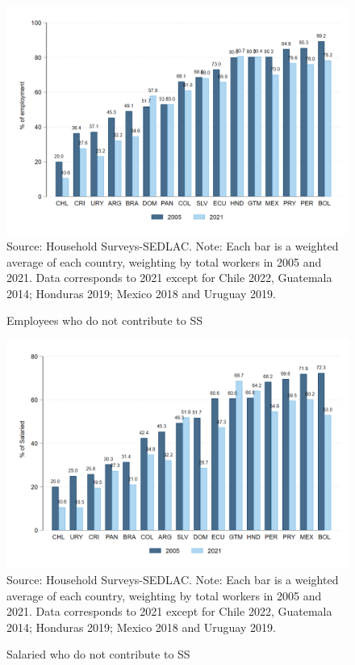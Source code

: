 \documentclass[english]{article}
\begin{document}
\begin{figure}[h!tbp]
    \justifying
     \caption{Employees who do not contribute to SS}     
     \includegraphics[scale=.3]{latex/figures/Snapshot/snapshot_informal_ss.png}
    \label{fig:SalariedSS}
    \footnotesize{Source: Household Surveys-SEDLAC.}
    \footnotesize{Note: Each bar is a weighted average of each country, weighting by total workers in 2005 and 2021.  Data corresponds to 2021 except for Chile 2022, Guatemala 2014; Honduras 2019; Mexico 2018 and Uruguay 2019.}
\end{figure}

\begin{figure}[h!tbp]
    \justifying
     \caption{Salaried who do not contribute to SS}     
     \includegraphics[scale=.3]{latex/figures/Snapshot/snapshot_informal_ss_dep.png}
    \label{fig:SalariedSS}
    \footnotesize{Source: Household Surveys-SEDLAC.}
    \footnotesize{Note: Each bar is a weighted average of each country, weighting by total workers in 2005 and 2021.  Data corresponds to 2021 except for Chile 2022, Guatemala 2014; Honduras 2019; Mexico 2018 and Uruguay 2019.}
\end{figure}
\end{document}
